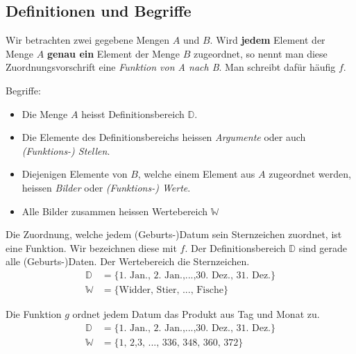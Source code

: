 \documentclass[11pt,oneside]{article}
\begin{document}
\subsection{Definitionen und Begriffe}\vspace{5pt}
    \begin{definition}[Funktion]
        Wir betrachten zwei gegebene Mengen $A$ und $B$.  Wird \textbf{jedem} Element der Menge $A$ \textbf{genau ein} Element der Menge $B$ zugeordnet, so nennt man diese Zuordnungsvorschrift eine \emph{Funktion von A nach B}. Man schreibt dafür häufig $f$.
    \end{definition}
	Begriffe:
	\begin{itemize}
		\item Die Menge $A$ heisst Definitionsbereich $\mathbb{D}$.
		\item Die Elemente des Definitionsbereichs heissen \emph{Argumente} oder auch \emph{(Funktions-) Stellen}.
		\item Diejenigen Elemente von $B$, welche einem Element aus $A$ zugeordnet werden, heissen \emph{Bilder} oder \emph{(Funktions-) Werte}.
		\item Alle Bilder zusammen heissen Wertebereich $\mathbb{W}$
	\end{itemize}
	\begin{beispiel}
		\label{bsp:sternzeichen}
		Die Zuordnung, welche jedem (Geburts-)Datum sein Sternzeichen zuordnet, ist eine Funktion. Wir bezeichnen diese mit $f$.
		Der Definitionsbereich $\mathbb{D}$ sind gerade alle (Geburts-)Daten. Der Wertebereich die Sternzeichen.
		\begin{align*}
			\mathbb{D}&=\{\text{1. Jan., 2. Jan.,...,30. Dez., 31. Dez.}\}\\
			\mathbb{W}&=\{\text{Widder, Stier, ..., Fische}\}
		\end{align*}
		\begin{framed}
			\vspace{3.5cm}
		\end{framed}
	\end{beispiel}
	\begin{beispiel}
		\label{bsp:produktdatum}
		Die Funktion $g$ ordnet jedem Datum das Produkt aus Tag und Monat zu.
		\begin{align*}
			\mathbb{D}&=\{\text{1. Jan., 2. Jan.,...,30. Dez., 31. Dez.}\}\\
			\mathbb{W}&=\{\text{1, 2,3, ..., 336, 348, 360, 372}\}
		\end{align*}
		\begin{framed}
			\vspace{3.5cm}
		\end{framed}
	\end{beispiel}
\end{document}
